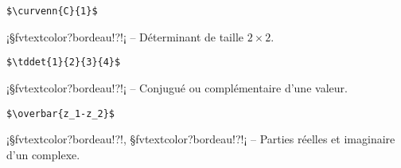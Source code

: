 \documentclass[11pt,a4paper,rgb]{report}
\begin{document}
\colorbox{blue!15}{}
\hfill
\begin{minipage}{.65\textwidth}
	\begin{lstlisting}[linewidth=\textwidth, language={[LaTeX]TeX}]
	$\curvenn{C}{1}$
	\end{lstlisting}
\end{minipage}

\setlength{\leftskip}{0pt}
\setlength{\textwidth}{18cm}%


\vspace*{.75cm}

\inCodeStub¡§fvtextcolor?bordeau!?!¡ -- Déterminant de taille $2\times2$.

\setlength{\leftskip}{.75cm}%
\setlength{\textwidth}{17.25cm}%

\colorbox{blue!15}{}
\hfill
\begin{minipage}{.65\textwidth}
	\begin{lstlisting}[linewidth=\textwidth, language={[LaTeX]TeX}]
	$\tddet{1}{2}{3}{4}$
	\end{lstlisting}
\end{minipage}

\setlength{\leftskip}{0pt}
\setlength{\textwidth}{18cm}%


\vspace*{.75cm}

\inCodeStub¡§fvtextcolor?bordeau!?!¡ -- Conjugué ou complémentaire d'une valeur.

\setlength{\leftskip}{.75cm}%
\setlength{\textwidth}{17.25cm}%

\colorbox{blue!15}{}
\hfill
\begin{minipage}{.65\textwidth}
	\begin{lstlisting}[linewidth=\textwidth, language={[LaTeX]TeX}]
	$\overbar{z_1-z_2}$
	\end{lstlisting}
\end{minipage}

\setlength{\leftskip}{0pt}
\setlength{\textwidth}{18cm}%


\vspace*{.75cm}

\inCodeStub¡§fvtextcolor?bordeau!?!, §fvtextcolor?bordeau!?!¡ -- Parties réelles et imaginaire d'un complexe.
\end{document}
